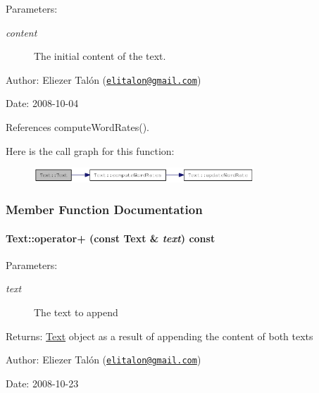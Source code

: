\begin{Desc}
\item[Parameters:]
\begin{description}
\item[{\em content}]The initial content of the text.\end{description}
\end{Desc}
\begin{Desc}
\item[Author:]Eliezer Talón (\href{mailto:elitalon@gmail.com}{\tt elitalon@gmail.com}) \end{Desc}
\begin{Desc}
\item[Date:]2008-10-04 \end{Desc}


References computeWordRates().

Here is the call graph for this function:\nopagebreak
\begin{figure}[H]
\begin{center}
\leavevmode
\includegraphics[width=235pt]{class_text_c3c20ee8baeb7b88e2622724f57e50a2_cgraph}
\end{center}
\end{figure}


\subsubsection{Member Function Documentation}
\hypertarget{class_text_c8887fb224e0402448ede4f3b9f7452d}{
\paragraph[operator+]{ Text::operator+ (const {\bf Text} \& {\em text}) const}\hfill}
\label{class_text_c8887fb224e0402448ede4f3b9f7452d}


\begin{Desc}
\item[Parameters:]
\begin{description}
\item[{\em text}]The text to append\end{description}
\end{Desc}
\begin{Desc}
\item[Returns:]\hyperlink{class_text}{Text} object as a result of appending the content of both texts\end{Desc}
\begin{Desc}
\item[Author:]Eliezer Talón (\href{mailto:elitalon@gmail.com}{\tt elitalon@gmail.com}) \end{Desc}
\begin{Desc}
\item[Date:]2008-10-23 \end{Desc}


